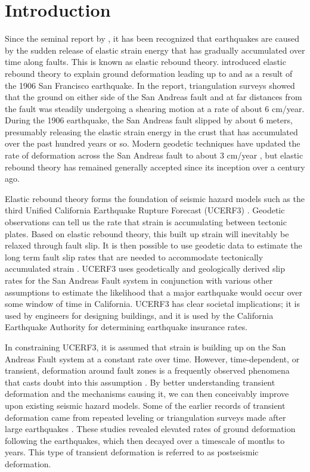 \chapter{Introduction}
Since the seminal report by \citet{Reid1910}, it has been recognized
that earthquakes are caused by the sudden release of elastic strain
energy that has gradually accumulated over time along faults. This is
known as elastic rebound theory. \citet{Reid1910} introduced elastic
rebound theory to explain ground deformation leading up to and as a
result of the 1906 San Francisco earthquake. In the report,
triangulation surveys showed that the ground on either side of the San
Andreas fault and at far distances from the fault was steadily
undergoing a shearing motion at a rate of about 6 cm/year. During the
1906 earthquake, the San Andreas fault slipped by about 6 meters,
presumably releasing the elastic strain energy in the crust that has
accumulated over the past hundred years or so. Modern geodetic
techniques have updated the rate of deformation across the San Andreas
fault to about 3 cm/year \citep{Savage1973}, but elastic rebound
theory has remained generally accepted since its inception over a
century ago.

Elastic rebound theory forms the foundation of seismic hazard models
such as the third Unified California Earthquake Rupture Forecast
(UCERF3) \citep{Field2014}. Geodetic observations can tell us the rate
that strain is accumulating between tectonic plates. Based on elastic
rebound theory, this built up strain will inevitably be relaxed through
fault slip. It is then possible to use geodetic data to estimate the
long term fault slip rates that are needed to accommodate tectonically
accumulated strain \citep[e.g.,][]{Savage1973,Meade2005}. UCERF3 uses
geodetically and geologically derived slip rates for the San Andreas
Fault system in conjunction with various other assumptions to estimate
the likelihood that a major earthquake would occur over some window of
time in California. UCERF3 has clear societal implications; it is used
by engineers for designing buildings, and it is used by the California
Earthquake Authority for determining earthquake insurance rates.

In constraining UCERF3, it is assumed that strain is building up on
the San Andreas Fault system at a constant rate over time. However,
time-dependent, or transient, deformation around fault zones is a
frequently observed phenomena that casts doubt into this assumption
\citep{Thatcher1983}. By better understanding transient deformation
and the mechanisms causing it, we can then conceivably improve upon
existing seismic hazard models. Some of the earlier records of
transient deformation came from repeated leveling or triangulation
surveys made after large earthquakes \citep[e.g.,][]{Tsuboi1932,
Smith1968}. These studies revealed elevated rates of ground
deformation following the earthquakes, which then decayed over a
timescale of months to years. This type of transient deformation is
referred to as postseismic deformation.

